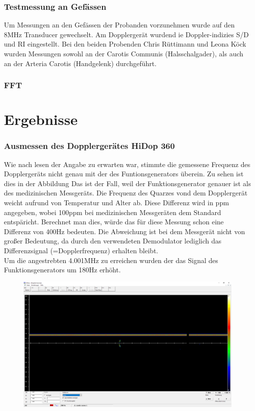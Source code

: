 \documentclass[11pt]{scrartcl}
\begin{document}
    \subsubsection{Testmessung an Gefässen}
    Um Messungen an den Gefässen der Probanden vorzunehmen wurde auf den 8MHz Transducer gewechselt. 
    Am Dopplergerät wurdend ie Doppler-indizies S/D und RI eingestellt. 
    Bei den beiden Probenden Chris Rüttimann und Leona Köck wurden Messungen sowohl an der Carotis Communis (Halsschalgader), als auch an der Arteria Carotis (Handgelenk) durchgeführt.

    \subsubsection{FFT}

    \section{Ergebnisse}
    \subsubsection{Ausmessen des Dopplergerätes HiDop 360}
    Wie nach lesen der Angabe zu erwarten war, stimmte die gemessene Frequenz des Dopplergeräts nicht genau mit der des Funtionsgenerators überein.
    Zu sehen ist dies in der Abbildung 
    Das ist der Fall, weil der Funktionsgenerator genauer ist als des medizinischen Messgeräts.
    Die Frequenz des Quarzes vond dem Dopplergerät weicht aufrund von Temperatur und Alter ab. 
    Diese Differenz wird in ppm angegeben, wobei 100ppm bei medizinischen Messgeräten dem Standard entspäricht.
    Berechnet man dies, würde das für diese Messung schon eine Differenz von 400Hz bedeuten. 
    Die Abweichung ist bei dem Messgerät nicht von großer Bedeutung, da durch den verwendeten Demodulator lediglich das Differenzsignal (=Dopplerfrequenz) erhalten bleibt.\\
    Um die angestrebten 4.001MHz zu erreichen wurden der das Signal des Funktionsgenerators um 180Hz erhöht. 

    \begin{figure}[H]
        \includegraphics[width=16cm]{images/4001MHz.png}
    \end{figure}
\end{document}
